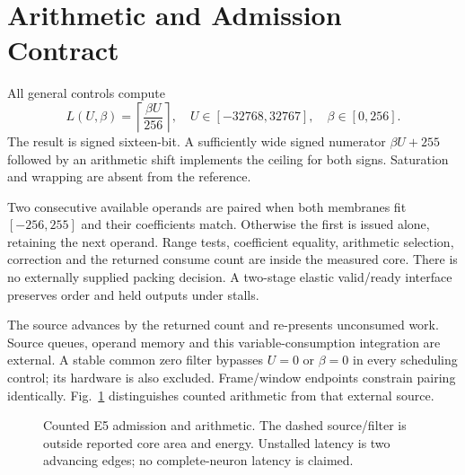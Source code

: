 \documentclass[conference]{IEEEtran}
\begin{document}
\section{Arithmetic and Admission Contract}
All general controls compute
\begin{equation}
 L(U,\beta)=\left\lceil\frac{\beta U}{256}\right\rceil,
 \quad U\in[-32768,32767],\quad\beta\in[0,256].
 \label{eq:leak}
\end{equation}
The result is signed sixteen-bit. A sufficiently wide signed numerator $\beta U+255$ followed by an arithmetic shift implements the ceiling for both signs. Saturation and wrapping are absent from the reference.

Two consecutive available operands are paired when both membranes fit $[-256,255]$ and their coefficients match. Otherwise the first is issued alone, retaining the next operand. Range tests, coefficient equality, arithmetic selection, correction and the returned consume count are inside the measured core. There is no externally supplied packing decision. A two-stage elastic valid/ready interface preserves order and held outputs under stalls.

The source advances by the returned count and re-presents unconsumed work. Source queues, operand memory and this variable-consumption integration are external. A stable common zero filter bypasses $U=0$ or $\beta=0$ in every scheduling control; its hardware is also excluded. Frame/window endpoints constrain pairing identically. Fig.~\ref{fig:datapath} distinguishes counted arithmetic from that external source.

\begin{figure}[t]
\centering
{}
\caption{Counted E5 admission and arithmetic. The dashed source/filter is outside reported core area and energy. Unstalled latency is two advancing edges; no complete-neuron latency is claimed.}
\label{fig:datapath}
\end{figure}
\end{document}
